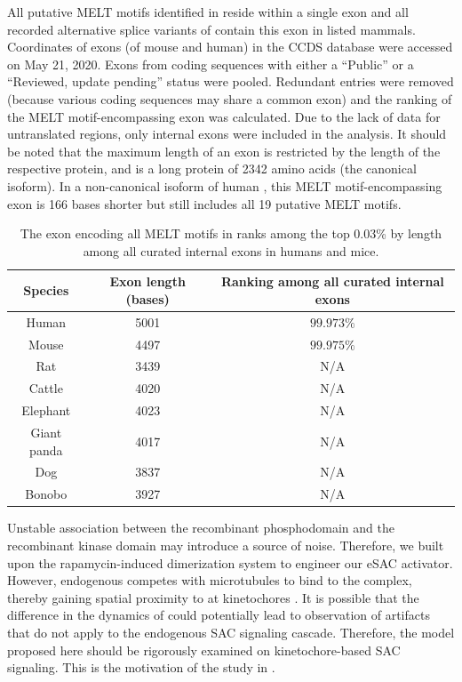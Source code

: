 \begin{table}
    \renewcommand{\arraystretch}{1.5}
    \caption{The exon encoding all MELT motifs in  ranks among the top 0.03\% by length among all curated internal exons in humans and mice.}
    \noindent\justifying All putative MELT motifs identified in \cite{MELTEvolution} reside within a single exon and all recorded alternative splice variants of  contain this exon in listed mammals. Coordinates of exons (of mouse and human) in the CCDS database \cite{CCDS} were accessed on May 21, 2020. Exons from coding sequences with either a ``Public'' or a ``Reviewed, update pending'' status were pooled. Redundant entries were removed (because various coding sequences may share a common exon) and the ranking of the MELT motif-encompassing exon was calculated. Due to the lack of data for untranslated regions, only internal exons were included in the analysis. It should be noted that the maximum length of an exon is restricted by the length of the respective protein, and  is a long protein of \SI{2342}{} amino acids (the canonical isoform). In a non-canonical isoform of human , this MELT motif-encompassing exon is 166 bases shorter but still includes all 19 putative MELT motifs.
    \label{ExonLength}
    \begin{center}
        \begin{tabular}{c c c}
            \hline
            Species & Exon length (bases) & Ranking among all curated internal exons\\
            \hline
            Human & 5001 & $99.973\%$\\
            Mouse & 4497 & $99.975\%$\\
            Rat & 3439 & N/A\\
            Cattle & 4020 & N/A\\
            Elephant & 4023 & N/A\\ %
            Giant panda & 4017 & N/A\\
            Dog & 3837 & N/A\\
            Bonobo & 3927 & N/A\\
            \hline
        \end{tabular}
    \end{center}
\end{table}

Unstable association between the recombinant  phosphodomain and the recombinant  kinase domain may introduce a source of noise. Therefore, we built upon the rapamycin-induced dimerization system to engineer our eSAC activator. However, endogenous  competes with microtubules to bind to the  complex, thereby gaining spatial proximity to  at kinetochores \cite{MPS1Localization_Ji, MPS1Localization_Hiruma}. It is possible that the difference in the dynamics of  could potentially lead to observation of artifacts that do not apply to the endogenous SAC signaling cascade. Therefore, the model proposed here should be rigorously examined on kinetochore-based SAC signaling. This is the motivation of the study in .

